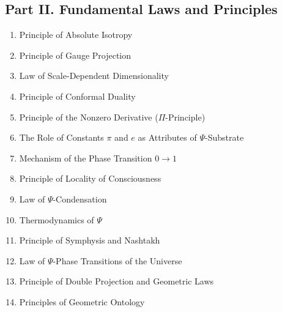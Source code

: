 \documentclass[a4paper,12pt]{article}
\begin{document}
	\subsection*{Part II. Fundamental Laws and Principles}
	\begin{enumerate}[label=2.\arabic*.]
		\item Principle of Absolute Isotropy
		\item Principle of Gauge Projection
		\item Law of Scale-Dependent Dimensionality
		\item Principle of Conformal Duality
		\item Principle of the Nonzero Derivative ($\Pi$-Principle)
		\item The Role of Constants $\pi$ and $e$ as Attributes of $\Psi$-Substrate
		\item Mechanism of the Phase Transition $0 \to 1$
		\item Principle of Locality of Consciousness
		\item Law of $\Psi$-Condensation
		\item Thermodynamics of $\Psi$
		\item Principle of Symphysis and Nashtakh
		\item Law of $\Psi$-Phase Transitions of the Universe
		\item Principle of Double Projection and Geometric Laws
		\item Principles of Geometric Ontology
	\end{enumerate}
	
\end{document}
